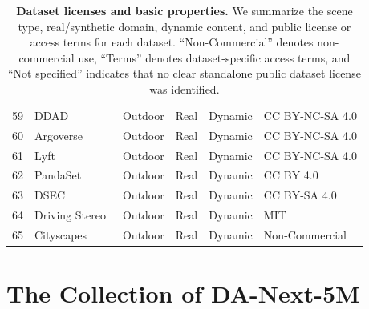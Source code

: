 \documentclass{llmxive}
\providecommand{\dataset}{DA-Next-5M\xspace}
\begin{document}
\begin{table}[h]
\begin{tabularx}{\textwidth}{@{}c >{\centering\arraybackslash}X c c c >{\centering\arraybackslash}X@{}}
59 & DDAD~\cite{guizilini2020packnet} & Outdoor & Real & Dynamic & CC BY-NC-SA 4.0 \\
60 & Argoverse~\cite{chang2019argoverse} & Outdoor & Real & Dynamic & CC BY-NC-SA 4.0 \\
61 & Lyft~\cite{houston2021one} & Outdoor & Real & Dynamic & CC BY-NC-SA 4.0 \\
62 & PandaSet~\cite{xiao2021pandaset} & Outdoor & Real & Dynamic & CC BY 4.0 \\
63 & DSEC~\cite{gehrig2021dsec} & Outdoor & Real & Dynamic & CC BY-SA 4.0 \\
64 & Driving Stereo~\cite{yang2019drivingstereo} & Outdoor & Real & Dynamic & MIT \\
65 & Cityscapes~\cite{cordts2016cityscapes} & Outdoor & Real & Dynamic & Non-Commercial \\
\bottomrule
\end{tabularx}
\caption{\textbf{Dataset licenses and basic properties.}
We summarize the scene type, real/synthetic domain, dynamic content, and public license or access terms for each dataset.
``Non-Commercial'' denotes non-commercial use, ``Terms'' denotes dataset-specific access terms, and ``Not specified'' indicates that no clear standalone public dataset license was identified.}
\label{tab:dataset_profile_summary_cited}
\end{table}


\section{The Collection of \dataset}
\label{appendix:datasets}
\end{document}

